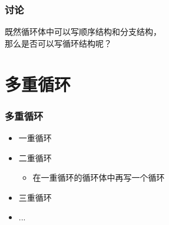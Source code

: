 \begin{frame}[fragile]
    \frametitle{讨论}

    \begin{block}{}
        \vspace{.5cm}
        \begin{center}
            {\large 既然循环体中可以写顺序结构和分支结构，\\那么是否可以写循环结构呢？}
        \end{center}
        \vspace{.5cm}
    \end{block}

\end{frame}


\section{多重循环}

\begin{frame}[fragile]
    \frametitle{多重循环}

    \begin{itemize}[<+->]
        \item 一重循环
        \item 二重循环
        
        \begin{itemize}
            \item 在一重循环的循环体中再写一个循环
        \end{itemize}

        \item 三重循环
        \item ...
    \end{itemize}
\end{frame}

